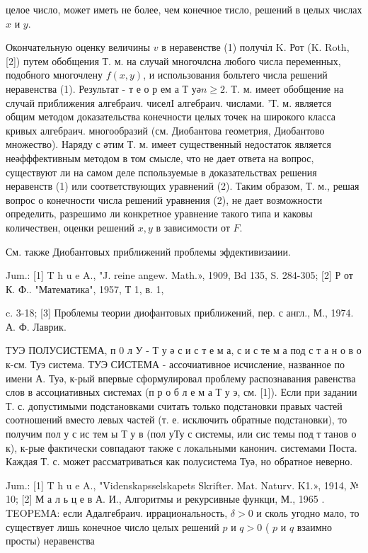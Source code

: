 \documentclass[10pt]{article}
\begin{document}
целое число, может иметь не более, чем конечное тисло, решений в целых числах $x$ и $y$.



Окончательную оценку величины $v$ в неравенстве (1) получіл K. Рот (K. Roth, [2]) путем обобщения Т. м. на случай многочлсна любого числа переменных, подобного многочлену $f(x, y)$, и использования больтего числа решений неравенства (1). Результат - т е о р ем а Т уә$n \geqslant 2$. Т. м. имеет обобщение на случай приближения алгебраич. чиселI алгебраич. числами. 'Т. м. является общим методом доказательства конечности целых точек на широкого класса кривых алгебраич. многообразий (см. Диобантова геометрия, Диобантово множество). Наряду с әтим Т. м. имеет существенный недостаток является неәфффективным методом в том смысле, что не дает ответа на вопрос, существуют ли на самом деле пспользуемые в доказательствах решения неравенств (1) или соответствующих уравнений (2). Таким образом, Т. м., решая вопрос о конечности числа решений уравнения (2), не дает возможности определить, разрешимо ли конкретное уравнение такого типа и каковы количествен, оценки решений $x, y$ в зависимости от $F$.



См. также Диобантовых приближений проблемы эфдективизаиии.



Jum.: [1] T h u e A., "J. reine angew. Math.», 1909, Bd 135, S. 284-305; [2] Р от К. Ф.. "Математика", 1957, Т 1, в. 1,

c. 3-18; [3] Проблемы теории диофантовых приближений, пер. с англ., М., 1974. А. Ф. Лаврик.



ТУЭ ПОЛУСИСТЕМА, п 0 л У - Т у ә с и с т е м а, с и с те м а под с т а н о в о к-см. Туэ система. ТУЭ СИСТЕМА - ассочиативное исчисление, названное по имени А. Туә, к-рый впервые сформулировал проблему распознавания равенства слов в ассоциативных системах (п р о б л е м а Т у э, см. [1]). Если при задании Т. с. допустимыми подстановками считать только подстановки правых частей соотношений вместо левых частей (т. е. исключить обратные подстановки), то получим пол у с ис тем ы Т у в (пол уТу с системы, или сис темы под т танов о к), к-рые фактически совпадают также с локальными канонич. системами Поста. Каждая Т. с. может рассматриваться как полусистема Туә, но обратное неверно.



Jum.: [1] T h u e A., "Videnskapsselskapets Skrifter. Mat. Naturv. K1.», 1914, № 10; [2] М а л ь ц е в А. И., Алгоритмы и рекурсивные функци, М., 1965 . TEOPEMА: если Адалгебраич. иррациональность, $\delta>0$ и сколь угодно мало, то существует лишь конечное число целых решений $p$ и $q>0$ ( $p$ и $q$ взаимно просты) неравенства
\end{document}
